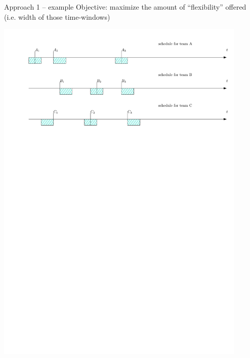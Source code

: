 \begin{frame}{Approach 1 -- example}
	Objective: maximize the amount of ``flexibility'' offered (i.e. width of those time-windows)

	\bigskip
	\begin{center}
		\includegraphics[width=0.9\textwidth]{team-schedules2}
	\end{center}
\end{frame}

